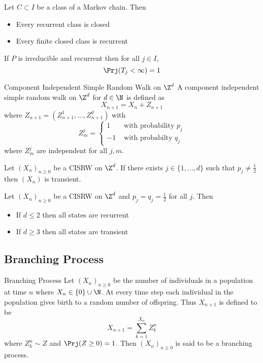 \documentclass[a4paper]{article}
\begin{document}
\begin{thm}{}{} Let $C\subset I$ be a class of a Markov chain. Then
\begin{itemize}
\item Every recurrent class is closed
\item Every finite closed class is recurrent
\end{itemize}
\end{thm}

\begin{thm}{}{} If $P$ is irreducible and recurrent then for all $j\in I$, $$\Prj(T_j<\infty)=1$$
\end{thm}

\begin{defn}{Component Independent Simple Random Walk on $\Z^d$}{} A component independent simple random walk on $\Z^d$ for $d\in\N$ is defined as $$X_{n+1}=X_n+Z_{n+1}$$ where $Z_{n+1}=(Z_{n+1}^1,\dots,Z_{n+1}^d)$ with $$Z_m^j=\begin{cases}
1 & \text{ with probability }p_j\\
-1 & \text{ with probabilty }q_j
\end{cases}$$
where $Z_m^j$ are independent for all $j,m$. 
\end{defn}

\begin{prp}{}{} Let $(X_n)_{n\geq 0}$ be a CISRW on $\Z^d$. If there exists $j\in\{1,\dots,d\}$ such that $p_j\neq\frac{1}{2}$ then $(X_n)$ is transient. 
\end{prp}

\begin{prp}{}{} Let $(X_n)_{n\geq 0}$ be a CISRW on $\Z^d$ and $p_j=q_j=\frac{1}{2}$ for all $j$. Then
\begin{itemize}
\item If $d\leq 2$ then all states are recurrent
\item If $d\geq 3$ then all states are transient
\end{itemize}
\end{prp}

\subsection{Branching Process}
\begin{defn}{Branching Process}{} Let $(X_n)_{n\geq 0}$ be the number of individuals in a population at time $n$ where $X_n\in\{0\}\cup\N$. At every time step each individual in the population gives birth to a random number of offspring. Thus $X_{n+1}$ is defined to be $$X_{n+1}=\sum_{k=1}^{X_n}Z_k^n$$ where $Z_k^n\sim Z$ and $\Prj(Z\geq 0)=1$. Then $(X_n)_{n\geq 0}$ is said to be a branching process. 
\end{defn}
\end{document}
